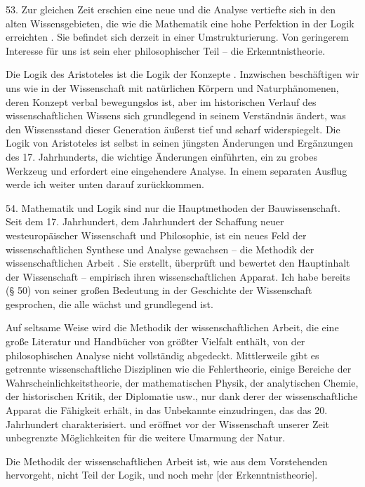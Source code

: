 \documentclass[11pt,a4paper]{book}
\begin{document}
53. Zur gleichen Zeit erschien eine neue und die Analyse vertiefte sich in den alten Wissensgebieten, die wie die Mathematik eine hohe Perfektion in der Logik erreichten . Sie befindet sich derzeit in einer Umstrukturierung. Von geringerem Interesse für uns ist sein eher philosophischer Teil -- die Erkenntnistheorie.



Die Logik des Aristoteles ist die Logik der Konzepte . Inzwischen beschäftigen wir uns wie in der Wissenschaft mit natürlichen Körpern und Naturphänomenen, deren Konzept verbal bewegungslos ist, aber im historischen Verlauf des wissenschaftlichen Wissens sich grundlegend in seinem Verständnis ändert, was den Wissensstand dieser Generation äußerst tief und scharf widerspiegelt. Die Logik von Aristoteles ist selbst in seinen jüngsten Änderungen und Ergänzungen des 17. Jahrhunderts, die wichtige Änderungen einführten, ein zu grobes Werkzeug und erfordert eine eingehendere Analyse. In einem separaten Ausflug werde ich weiter unten darauf zurückkommen.



54. Mathematik und Logik sind nur die Hauptmethoden der Bauwissenschaft. Seit dem 17. Jahrhundert, dem Jahrhundert der Schaffung neuer westeuropäischer Wissenschaft und Philosophie, ist ein neues Feld der wissenschaftlichen Synthese und Analyse gewachsen -- die Methodik der wissenschaftlichen Arbeit . Sie erstellt, überprüft und bewertet den Hauptinhalt der Wissenschaft -- empirisch ihren wissenschaftlichen Apparat. Ich habe bereits (§ 50) von seiner großen Bedeutung in der Geschichte der Wissenschaft gesprochen, die alle wächst und grundlegend ist.



Auf seltsame Weise wird die Methodik der wissenschaftlichen Arbeit, die eine große Literatur und Handbücher von größter Vielfalt enthält, von der philosophischen Analyse nicht vollständig abgedeckt. Mittlerweile gibt es getrennte wissenschaftliche Disziplinen wie die Fehlertheorie, einige Bereiche der Wahrscheinlichkeitstheorie, der mathematischen Physik, der analytischen Chemie, der historischen Kritik, der Diplomatie usw., nur dank derer der wissenschaftliche Apparat die Fähigkeit erhält, in das Unbekannte einzudringen, das das 20. Jahrhundert charakterisiert. und eröffnet vor der Wissenschaft unserer Zeit unbegrenzte Möglichkeiten für die weitere Umarmung der Natur.



Die Methodik der wissenschaftlichen Arbeit ist, wie aus dem Vorstehenden hervorgeht, nicht Teil der Logik, und noch mehr [der Erkenntnistheorie].
\end{document}
